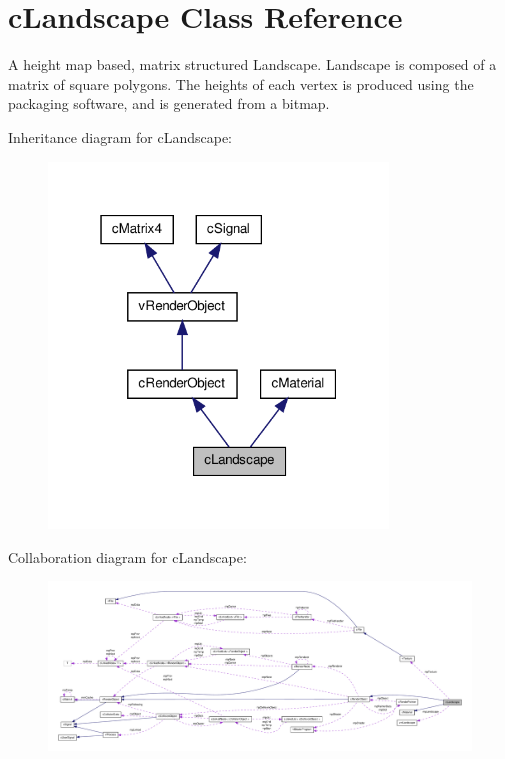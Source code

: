 \hypertarget{classc_landscape}{
\section{cLandscape Class Reference}
\label{classc_landscape}
}


A height map based, matrix structured Landscape. Landscape is composed of a matrix of square polygons. The heights of each vertex is produced using the packaging software, and is generated from a bitmap.  




Inheritance diagram for cLandscape:
\nopagebreak
\begin{figure}[H]
\begin{center}
\leavevmode
\includegraphics[width=256pt]{classc_landscape__inherit__graph}
\end{center}
\end{figure}


Collaboration diagram for cLandscape:
\nopagebreak
\begin{figure}[H]
\begin{center}
\leavevmode
\includegraphics[width=400pt]{classc_landscape__coll__graph}
\end{center}
\end{figure}
